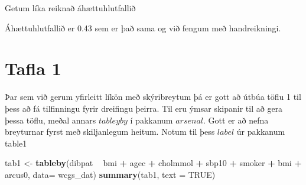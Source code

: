 \documentclass[
]{book}
\newenvironment{Shaded}{\begin{snugshade}}{\end{snugshade}}
\newcommand{\DataTypeTok}[1]{\textcolor[rgb]{0.13,0.29,0.53}{#1}}
\newcommand{\DecValTok}[1]{\textcolor[rgb]{0.00,0.00,0.81}{#1}}
\newcommand{\KeywordTok}[1]{\textcolor[rgb]{0.13,0.29,0.53}{\textbf{#1}}}
\newcommand{\NormalTok}[1]{#1}
\newcommand{\OperatorTok}[1]{\textcolor[rgb]{0.81,0.36,0.00}{\textbf{#1}}}
\newcommand{\OtherTok}[1]{\textcolor[rgb]{0.56,0.35,0.01}{#1}}
\newcommand{\StringTok}[1]{\textcolor[rgb]{0.31,0.60,0.02}{#1}}
\begin{document}
Getum líka reiknað áhættuhlutfallið

\begin{Shaded}
\end{Shaded}

Áhættuhlutfallið er 0.43 sem er það sama og við fengum með handreikningi.

\hypertarget{tafla-1}{%
\section{Tafla 1}\label{tafla-1}}

Þar sem við gerum yfirleitt líkön með skýribreytum þá er gott að útbúa töflu 1 til þess að fá tilfinningu fyrir dreifingu þeirra. Til eru ýmsar skipanir til að gera þessa töflu, meðal annars \(tableyby\) í pakkanum \(arsenal\). Gott er að nefna breyturnar fyrst með skiljanlegum heitum. Notum til þess \(label\) úr pakkanum table1

\begin{Shaded}
\end{Shaded}

\begin{Shaded}
\begin{Highlighting}[]
\NormalTok{tab1 <-}\StringTok{ }\KeywordTok{tableby}\NormalTok{(dibpat }\OperatorTok{~}\StringTok{ }\NormalTok{bmi }\OperatorTok{+}\StringTok{ }\NormalTok{agec }\OperatorTok{+}\StringTok{ }\NormalTok{cholmmol }\OperatorTok{+}\StringTok{ }\NormalTok{sbp10 }\OperatorTok{+}\StringTok{ }\NormalTok{smoker }\OperatorTok{+}\StringTok{ }\NormalTok{bmi }\OperatorTok{+}\StringTok{ }\NormalTok{arcus0, }\DataTypeTok{data=}\NormalTok{ wcgs_dat)}
\KeywordTok{summary}\NormalTok{(tab1, }\DataTypeTok{text =} \OtherTok{TRUE}\NormalTok{)}
\end{Highlighting}
\end{Shaded}
\end{document}
